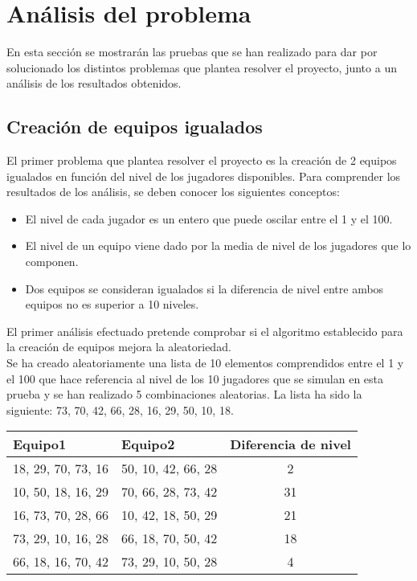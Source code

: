 \chapter{Análisis del problema}
 
En esta sección se mostrarán las pruebas que se han realizado para dar por solucionado los distintos problemas que plantea resolver 
el proyecto, junto a un análisis de los resultados obtenidos.

\section{Creación de equipos igualados}

El primer problema que plantea resolver el proyecto es la creación de 2 equipos igualados en función del nivel de los jugadores disponibles.
Para comprender los resultados de los análisis, se deben conocer los siguientes conceptos:

\begin{itemize}
    \item El nivel de cada jugador es un entero que puede oscilar entre el 1 y el 100.
    \item El nivel de un equipo viene dado por la media de nivel de los jugadores que lo componen.
    \item Dos equipos se consideran igualados si la diferencia de nivel entre ambos equipos no es superior a 10 niveles.
\end{itemize}

\newpage

El primer análisis efectuado pretende comprobar si el algoritmo establecido para la creación de equipos mejora la aleatoriedad.\\

Se ha creado aleatoriamente una lista de 10 elementos comprendidos entre el 1 y el 100 que hace referencia al nivel de los 10 jugadores
que se simulan en esta prueba y se han realizado 5 combinaciones aleatorias. La lista ha sido la siguiente:  73, 70, 42, 66, 28, 16, 29, 50, 10, 18.\\


\begin{tabular}{| l | l | c |}
    \hline
    \textbf{Equipo1} & \textbf{Equipo2} & \textbf{Diferencia de nivel}\\
    \hline
    18, 29, 70, 73, 16 & 50, 10, 42, 66, 28 & 2\\
    \hline
    10, 50, 18, 16, 29 & 70, 66, 28, 73, 42 & 31\\
    \hline
    16, 73, 70, 28, 66 & 10, 42, 18, 50, 29 & 21\\
    \hline
    73, 29, 10, 16, 28 & 66, 18, 70, 50, 42 & 18\\
    \hline
    66, 18, 16, 70, 42 & 73, 29, 10, 50, 28 & 4\\
    \hline
\end{tabular}\\


